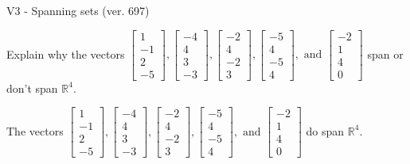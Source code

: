 \begin{exercise}
  \begin{exerciseTitle}V3 - Spanning sets (ver. 697)\end{exerciseTitle}
  \begin{exerciseStatement}
    Explain why the vectors \(\left[\begin{array}{r}
1 \\
-1 \\
2 \\
-5
\end{array}\right] , \left[\begin{array}{r}
-4 \\
4 \\
3 \\
-3
\end{array}\right] , \left[\begin{array}{r}
-2 \\
4 \\
-2 \\
3
\end{array}\right] , \left[\begin{array}{r}
-5 \\
4 \\
-5 \\
4
\end{array}\right] , \text{ and } \left[\begin{array}{r}
-2 \\
1 \\
4 \\
0
\end{array}\right]\) span or don't span \(\mathbb{R}^4\). 
	


  \end{exerciseStatement}
  \begin{exerciseAnswer}
   The vectors \(\left[\begin{array}{r}
1 \\
-1 \\
2 \\
-5
\end{array}\right] , \left[\begin{array}{r}
-4 \\
4 \\
3 \\
-3
\end{array}\right] , \left[\begin{array}{r}
-2 \\
4 \\
-2 \\
3
\end{array}\right] , \left[\begin{array}{r}
-5 \\
4 \\
-5 \\
4
\end{array}\right] , \text{ and } \left[\begin{array}{r}
-2 \\
1 \\
4 \\
0
\end{array}\right]\) 
  	 do  
	span \(\mathbb{R}^4\).
  



\end{exerciseAnswer}
\end{exercise}
